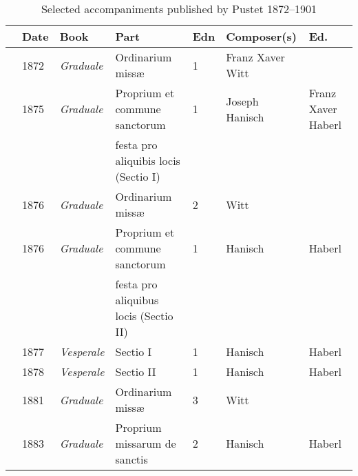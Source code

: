\begin{landscape}
\begin{table}[ht]
\centering
\footnotesize
\caption{Selected accompaniments published by Pustet 1872--1901}
\label{tab:pustet-accomp}
\begin{tabular}{@{}rllllll@{}}
\toprule
\multicolumn{1}{l}{} & Date & Book               & Part                                                   & Edn     & Composer(s)                  & Ed.                \\ \midrule
                           & 1872 & \textit{Graduale}  & Ordinarium missæ                                       & 1       & Franz Xaver Witt             &                    \\
                           & 1875 & \textit{Graduale}  & Proprium et commune sanctorum                          & 1       & Joseph Hanisch               & Franz Xaver Haberl \\
\multicolumn{1}{l}{}       &      & \textit{}          & \hspace*{2em}festa pro aliquibis locis (Sectio I)      &         &                              &                    \\
                           & 1876 & \textit{Graduale}  & Ordinarium missæ                                       & 2       & Witt                         &                    \\
\covid{}                    & 1876 & \textit{Graduale}  & Proprium et commune sanctorum                          & 1       & Hanisch                      & Haberl             \\
\multicolumn{1}{l}{}       &      & \textit{}          & \hspace*{2em}festa pro aliquibus locis (Sectio II)     &         &                              &                    \\
                           & 1877 & \textit{Vesperale} & Sectio I                                               & 1       & Hanisch                      & Haberl             \\
                           & 1878 & \textit{Vesperale} & Sectio II                                              & 1       & Hanisch                      & Haberl             \\
                           & 1881 & \textit{Graduale}  & Ordinarium missæ                                       & 3       & Witt                         &                    \\
                           & 1883 & \textit{Graduale}  & Proprium missarum de sanctis                           & 2       & Hanisch                      & Haberl             \\

\end{tabular}
\end{table}
\end{landscape}
